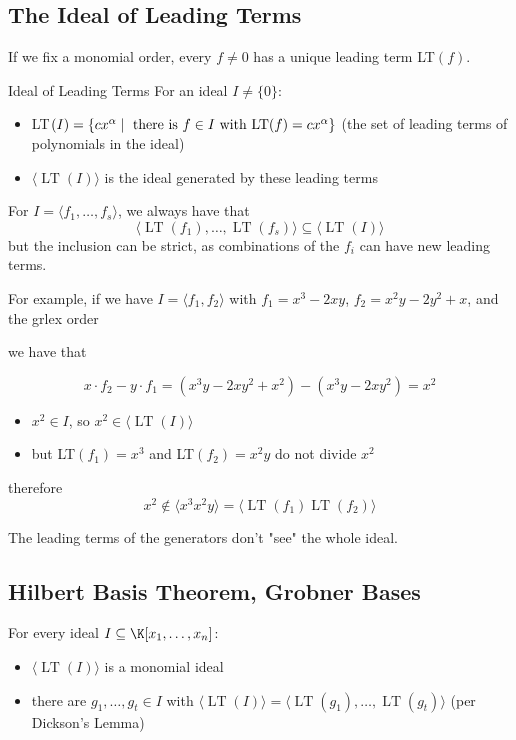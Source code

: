 \documentclass[a4paper, 11pt]{report}
\newcommand{\gen}[1]{\langle #1 \rangle}
\newcommand{\LT}{\operatorname{LT}}
\begin{document}
\subsection{The Ideal of Leading Terms}
If we fix a monomial order, every $f \neq 0$ has a unique leading term LT$(f)$.

\begin{defframe}{Ideal of Leading Terms}{}
    For an ideal $I \neq \{0\}$:
    \begin{itemize}
        \item LT$(I)= \set{cx^{\alpha}}[\text{ there is } f \in I \text{ with LT}(f) = cx^{\alpha} ]$ (the set of leading terms of polynomials in the ideal)
        \item $\langle \LT(I) \rangle$ is the ideal generated by these leading terms
    \end{itemize}
\end{defframe}

For $I = \langle f_1, \dots , f_{s} \rangle$, we always have that
$$ \langle \LT(f_1), \dots , \LT(f_{s}) \rangle \subseteq \langle \LT(I) \rangle $$
but the inclusion can be strict, as combinations of the $f_{i}$ can have new leading terms.

For example, if we have $I = \langle f_1, f_2\rangle$ with $f_1 = x^{3} - 2xy$, $f_2 = x^{2}y - 2y^{2}+x$, and the grlex order

we have that

$$ x \cdot f_2 - y \cdot f_1 = (x^{3}y -2xy^{2}+x^{2})-(x^{3}y-2xy^{2}) = x^{2}$$
\begin{itemize}
    \item $x^{2} \in I$, so $x^{2} \in \langle \LT(I) \rangle$
    \item but LT$(f_1) = x^{3}$ and LT$(f_2)=x^{2}y$ do not divide $x^{2}$
\end{itemize}
therefore
$$ x^{2} \not\in \langle x^{3} x^{2}y \rangle = \langle\LT(f_1) \LT(f_2) \rangle$$

\begin{gframe}{}
    The leading terms of the generators don't "see" the whole ideal.
\end{gframe}

\subsection{Hilbert Basis Theorem, Grobner Bases}

\begin{propframe}{}{}
    For every ideal $I \subseteq \K[x_1, \dots , x_{n}]$:
    \begin{itemize}
        \item $\langle\LT(I) \rangle$ is a monomial ideal
        \item there are $g_1, \dots , g_{t} \in I$ with $\langle \LT(I) \rangle = \gen{\LT(g_1), \dots, \LT(g_{t})}$ (per Dickson's Lemma)
    \end{itemize}
\end{propframe}
\end{document}
